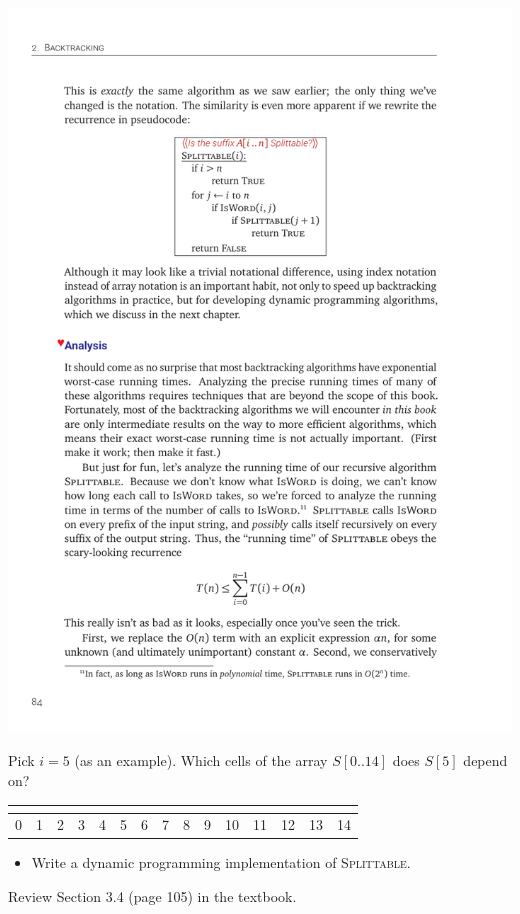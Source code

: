 \documentclass[12pt]{article}
\begin{document}
\includegraphics{w05-splittable-pc.pdf}

\vspace{2em}
Pick $i = 5$ (as an example). Which cells of the array $S[0..14]$ does $S[5]$ depend on?
\vspace{2em}

\begin{minipage}{1.0\textwidth}\centering
    \begin{tabular}{lllllllllllllll}
    \hline
    \multicolumn{1}{|l|}{} & \multicolumn{1}{l|}{} & \multicolumn{1}{l|}{} & \multicolumn{1}{l|}{} & \multicolumn{1}{l|}{} & \multicolumn{1}{l|}{} & \multicolumn{1}{l|}{} & \multicolumn{1}{l|}{} & \multicolumn{1}{l|}{} & \multicolumn{1}{l|}{} & \multicolumn{1}{l|}{} & \multicolumn{1}{l|}{} & \multicolumn{1}{l|}{} & \multicolumn{1}{l|}{} & \multicolumn{1}{l|}{} \\ \hline
    0                      & 1                     & 2                     & 3                     & 4                     & 5                     & 6                     & 7                     & 8                     & 9                     & 10                    & 11                    & 12                    & 13                    & 14                   
    \end{tabular}
\end{minipage}%

\begin{itemize}
    \item Write a dynamic programming implementation of \textsc{Splittable}.
\end{itemize}

\vfill

Review Section 3.4 (page 105) in the textbook. 
\end{document}

